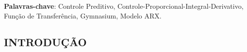 \documentclass[12pt,           %
a4paper,                       %
openany,                       %
oneside,                       %
chapter=TITLE,                 %
english,                       %
spanish,                       %
brazil,                        %
sumario=tradicional]{abntex2}  %
\begin{document}
\begin{OnehalfSpace}

\end{OnehalfSpace}                                  %
\begin{DoubleSpace}                                 %
	\setlength{\parindent}{0pt}                     %
	
	\textbf{Palavras-chave}: Controle Preditivo, Controle-Proporcional-Integral-Derivativo, Função de Transferência, Gymnasium, Modelo ARX.

\end{DoubleSpace}                                   %
\begin{OnehalfSpace}                                %
\newpage
{}

\renewcommand{\listfigurename}{LISTA DE FIGURAS}
\renewcommand{\listtablename}{LISTA DE TABELAS}
\renewcommand{\bibname}{REFERÊNCIAS BIBLIOGRÁFICAS}

		
\tableofcontents*
\cleardoublepage
\newpage



\listoffigures
\cleardoublepage


\listoftables
\cleardoublepage


{\let\clearpage\relax\par \chapter{INTRODUÇÃO}}
\label{ch:introducao}                       %
\textual                                    %
\pagestyle{fancy}							%
\lfoot{} \rfoot{} \cfoot{} \chead{}
\rhead{\hfill \small \thepage} \lhead{}				
\renewcommand{\headrulewidth}{0pt}			%


\end{OnehalfSpace}
\end{document}
